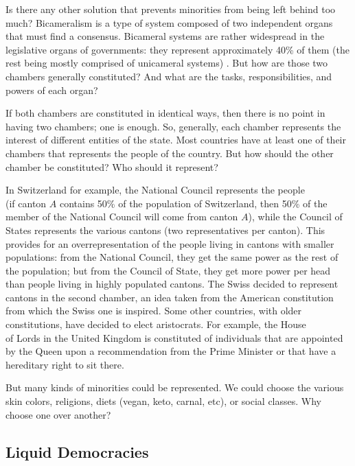 Is there any other solution that prevents minorities from being left behind too much?
Bicameralism is a type of system composed of two independent organs that must find a consensus.
Bicameral systems are rather widespread in the legislative organs of governments: they represent approximately 40\% of them (the rest being mostly comprised of unicameral systems) \cite{noauthor_ipu_2022}.
But how are those two chambers generally constituted?
And what are the tasks, responsibilities, and powers of each organ?

If both chambers are constituted in identical ways, then there is no point in having two chambers; one is enough.
So, generally, each chamber represents the interest of different entities of the state.
Most countries have at least one of their chambers that represents the people of the country.
But how should the other chamber be constituted?
Who should it represent?

In Switzerland for example, the National Council represents the people\\(if canton $A$ contains 50\% of the population of Switzerland, then 50\% of the member of the National Council will come from canton $A$), while the Council of States represents the various cantons (two representatives per canton).
This provides for an overrepresentation of the people living in cantons with smaller populations: from the National Council, they get the same power as the rest of the population; but from the Council of State, they get more power per head than people living in highly populated cantons.
The Swiss decided to represent cantons in the second chamber, an idea taken from the American constitution from which the Swiss one is inspired.
Some other countries, with older constitutions, have decided to elect aristocrats.
For example, the House\\of Lords in the United Kingdom is constituted of individuals that are appointed by the Queen upon a recommendation from the Prime Minister or that have a hereditary right to sit there.

But many kinds of minorities could be represented.
We could choose the various skin colors, religions, diets (vegan, keto, carnal, etc), or social classes.
Why choose one over another?

\subsection{Liquid Democracies}
\label{sec:liquid_democracy}

